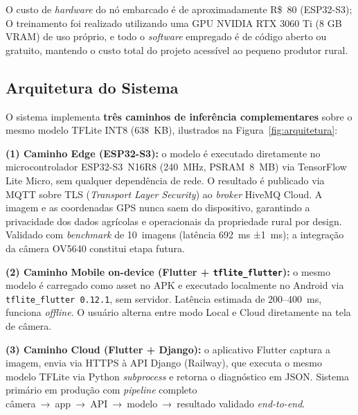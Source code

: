 \documentclass[12pt]{article}
\begin{document}
O custo de \textit{hardware} do nó embarcado é de aproximadamente R\$~80 (ESP32-S3);
O treinamento foi realizado utilizando uma GPU NVIDIA RTX 3060 Ti (8 GB VRAM) de uso próprio, e todo o \textit{software}
empregado é de código aberto ou gratuito, mantendo o custo total do projeto acessível
ao pequeno produtor rural.

\subsection{Arquitetura do Sistema}

O sistema implementa \textbf{três caminhos de inferência complementares} sobre o
mesmo modelo TFLite INT8 (638~KB), ilustrados na Figura~\ref{fig:arquitetura}:

\textbf{(1) Caminho Edge (ESP32-S3):} o modelo é executado diretamente no
microcontrolador ESP32-S3~N16R8 (240~MHz, PSRAM~8~MB) via TensorFlow Lite Micro,
sem qualquer dependência de rede. O resultado é publicado via MQTT sobre TLS
(\textit{Transport Layer Security}) ao \textit{broker} HiveMQ Cloud. A imagem e as coordenadas GPS nunca saem do dispositivo, garantindo a privacidade dos dados agrícolas e operacionais da propriedade rural por design. Validado com \textit{benchmark} de
10~imagens (latência 692~ms ±1~ms);
a integração da câmera OV5640 constitui etapa futura.

\textbf{(2) Caminho Mobile on-device (Flutter + \texttt{tflite\_flutter}):} o
mesmo modelo é carregado como asset no APK e executado localmente no Android via
\texttt{tflite\_flutter~0.12.1}, sem servidor. Latência estimada de 200--400~ms,
funciona \textit{offline}. O usuário alterna entre modo Local e Cloud diretamente
na tela de câmera.

\textbf{(3) Caminho Cloud (Flutter + Django):} o aplicativo Flutter captura a
imagem, envia via HTTPS à API Django (Railway), que executa o mesmo modelo TFLite
via Python \textit{subprocess} e retorna o diagnóstico em JSON. Sistema primário em
produção com \textit{pipeline} completo câmera~→~app~→~API~→~modelo~→~resultado
validado \textit{end-to-end}.
\end{document}
